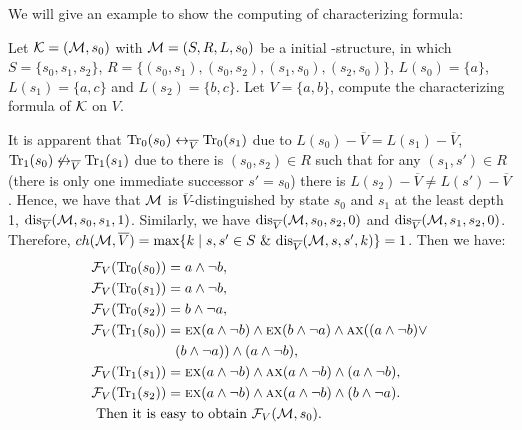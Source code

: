 \documentclass{article}
\begin{document}
We will give an example to show the computing of characterizing formula:
\begin{example}
Let ${\cal K} = ({\cal M}, s_0)$ with ${\cal M}=(S, R, L,s_0)$ be a initial \MPK-structure,%
 in which $S=\{s_0, s_1, s_2\}$, $R=\{(s_0, s_1), (s_0, s_2), (s_1, s_0), (s_2, s_0)\}$, $L(s_0)= \{a\}$, $L(s_1) =\{a,c\}$ and $L(s_2) = \{b,c\}$. Let $V=\{a, b\}$, compute the characterizing formula of ${\cal K}$ on $V$.

It is apparent that $\textrm{Tr}_0(s_0) \leftrightarrow_{\overline V} \textrm{Tr}_0(s_1)$ due to $L(s_0) - \overline V = L(s_1) -\overline V$, $\textrm{Tr}_1(s_0) \not\leftrightarrow_{\overline V} \textrm{Tr}_1(s_1)$ due to there is $(s_0, s_2)\in R$ such that for any $(s_1, s') \in R$ (there is only one immediate successor $s'=s_0$) there is $L(s_2) - \overline V \neq L(s') - \overline V$. Hence, we have that ${\cal M}$ is $\overline V$-distinguished by state $s_0$ and $s_1$ at the least depth 1, \ie $\textrm{dis}_{\overline V}({\cal M}, s_0, s_1, 1)$. Similarly, we have $\textrm{dis}_{\overline V}({\cal M}, s_0, s_2, 0)$ and $\textrm{dis}_{\overline V}({\cal M}, s_1, s_2, 0)$. Therefore, $ch({\cal M}, \overline V) =  \max\{k\mid s,s'\in S\ \&\ \textrm{dis}_{\overline V}({\cal M},s,s',k)\} = 1$.
Then we have:
\begin{align*}
  & {\cal F}_V(\textrm{Tr}_0(s_0)) = a \wedge \neg b, \\
  & {\cal F}_V(\textrm{Tr}_0(s_1)) = a \wedge \neg b, \\
  & {\cal F}_V(\textrm{Tr}_0(s_2)) = b \wedge \neg a, \\
  & {\cal F}_V(\textrm{Tr}_1(s_0)) = \textsc{e}\textsc{x}(a \wedge \neg b)  \wedge \textsc{e}\textsc{x}(b \wedge \neg a) \wedge \textsc{a}\textsc{x}((a \wedge \neg b) \vee\\
  & \qquad \qquad  \qquad (b \wedge \neg a)) \wedge (a \wedge \neg b), \\
  & {\cal F}_V(\textrm{Tr}_1(s_1)) = \textsc{e}\textsc{x}(a \wedge \neg b)  \wedge \textsc{a}\textsc{x}(a \wedge \neg b) \wedge (a \wedge \neg b), \\
  & {\cal F}_V(\textrm{Tr}_1(s_2)) = \textsc{e}\textsc{x}(a \wedge \neg b)  \wedge \textsc{a}\textsc{x}(a \wedge \neg b) \wedge (b \wedge \neg a).\\
  & \mbox{ Then it is easy to obtain\ } {\cal F}_V({\cal M}, s_0).
\end{align*}

\end{example}
\end{document}
